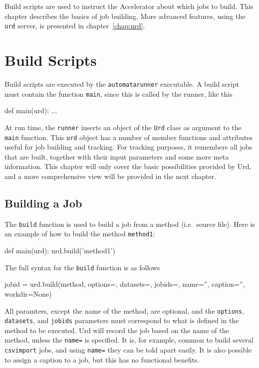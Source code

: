 \label{chap:urd_basic}

Build scripts are used to instruct the Accelerator about which jobs to
build.  This chapter describes the basics of job building.  More
advanced features, using the \texttt{urd} server, is presented in
chapter~\ref{chap:urd}.


\section{Build Scripts}
Build scripts are executed by the \texttt{automatarunner} executable.
A build script must contain the function \texttt{main}, since this is
called by the runner, like this
\begin{python}
def main(urd):
    ...
\end{python}
At run time, the \texttt{runner} inserts an object of the \texttt{Urd}
class as argument to the \texttt{main} function.  This \texttt{urd}
object has a number of member functions and attributes useful for job
building and tracking.  For tracking purposes, it remembers all jobs
that are built, together with their input parameters and some more
meta information.  This chapter will only cover the basic
possibilities provided by Urd, and a more comprehensive view will be
provided in the next chapter.



\subsection{Building a Job}
The \texttt{build} function is used to build a job from a method
(i.e.\ source file).  Here is an example of how to build the method
\texttt{method1}:
\begin{python}
def main(urd):
    urd.build('method1')
\end{python}
The full syntax for the \texttt{build} function is as follows
\begin{python}
jobid = urd.build(method,
                  options={}, datasets={}, jobids={},
                  name='', caption='', workdir=None)
\end{python}
All paramters, except the name of the method, are optional, and
the \texttt{options}, \texttt{datasets}, and \texttt{jobids}
parameters must correspond to what is defined in the method to be
executed.  Urd will record the job based on the name of the method,
unless the \texttt{name=} is specified.  It is, for example, common to
build several \texttt{csvimport} jobs, and using \texttt{name=} they
can be told apart easily.  It is also possible to assign a caption to
a job, but this has no functional benefits.

